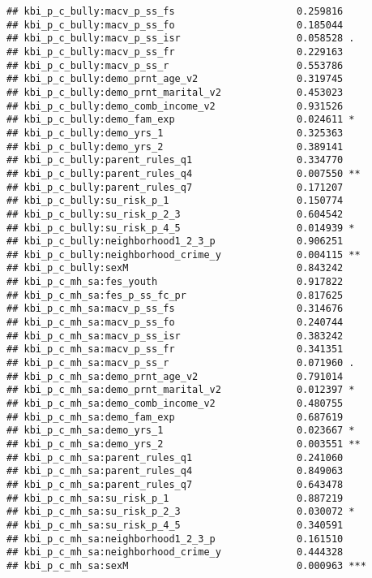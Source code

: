\documentclass[
]{article}
\begin{document}
\begin{verbatim}
## kbi_p_c_bully:macv_p_ss_fs                     0.259816    
## kbi_p_c_bully:macv_p_ss_fo                     0.185044    
## kbi_p_c_bully:macv_p_ss_isr                    0.058528 .  
## kbi_p_c_bully:macv_p_ss_fr                     0.229163    
## kbi_p_c_bully:macv_p_ss_r                      0.553786    
## kbi_p_c_bully:demo_prnt_age_v2                 0.319745    
## kbi_p_c_bully:demo_prnt_marital_v2             0.453023    
## kbi_p_c_bully:demo_comb_income_v2              0.931526    
## kbi_p_c_bully:demo_fam_exp                     0.024611 *  
## kbi_p_c_bully:demo_yrs_1                       0.325363    
## kbi_p_c_bully:demo_yrs_2                       0.389141    
## kbi_p_c_bully:parent_rules_q1                  0.334770    
## kbi_p_c_bully:parent_rules_q4                  0.007550 ** 
## kbi_p_c_bully:parent_rules_q7                  0.171207    
## kbi_p_c_bully:su_risk_p_1                      0.150774    
## kbi_p_c_bully:su_risk_p_2_3                    0.604542    
## kbi_p_c_bully:su_risk_p_4_5                    0.014939 *  
## kbi_p_c_bully:neighborhood1_2_3_p              0.906251    
## kbi_p_c_bully:neighborhood_crime_y             0.004115 ** 
## kbi_p_c_bully:sexM                             0.843242    
## kbi_p_c_mh_sa:fes_youth                        0.917822    
## kbi_p_c_mh_sa:fes_p_ss_fc_pr                   0.817625    
## kbi_p_c_mh_sa:macv_p_ss_fs                     0.314676    
## kbi_p_c_mh_sa:macv_p_ss_fo                     0.240744    
## kbi_p_c_mh_sa:macv_p_ss_isr                    0.383242    
## kbi_p_c_mh_sa:macv_p_ss_fr                     0.341351    
## kbi_p_c_mh_sa:macv_p_ss_r                      0.071960 .  
## kbi_p_c_mh_sa:demo_prnt_age_v2                 0.791014    
## kbi_p_c_mh_sa:demo_prnt_marital_v2             0.012397 *  
## kbi_p_c_mh_sa:demo_comb_income_v2              0.480755    
## kbi_p_c_mh_sa:demo_fam_exp                     0.687619    
## kbi_p_c_mh_sa:demo_yrs_1                       0.023667 *  
## kbi_p_c_mh_sa:demo_yrs_2                       0.003551 ** 
## kbi_p_c_mh_sa:parent_rules_q1                  0.241060    
## kbi_p_c_mh_sa:parent_rules_q4                  0.849063    
## kbi_p_c_mh_sa:parent_rules_q7                  0.643478    
## kbi_p_c_mh_sa:su_risk_p_1                      0.887219    
## kbi_p_c_mh_sa:su_risk_p_2_3                    0.030072 *  
## kbi_p_c_mh_sa:su_risk_p_4_5                    0.340591    
## kbi_p_c_mh_sa:neighborhood1_2_3_p              0.161510    
## kbi_p_c_mh_sa:neighborhood_crime_y             0.444328    
## kbi_p_c_mh_sa:sexM                             0.000963 ***

\end{verbatim}
\end{document}
